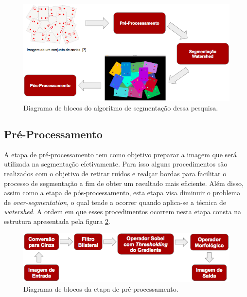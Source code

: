 	\begin{figure}[!htb]
       \begin{center}  
          \includegraphics[width=0.7\columnwidth]{img/diagrama_blocos_algoritmo.jpg}
           \caption{\label{fig:diagrama_blocos_algoritmo}Diagrama de blocos do algoritmo de segmentação dessa pesquisa.}
       \end{center}
   \end{figure} 

\subsection{Pré-Processamento}
A etapa de pré-processamento tem como objetivo preparar a imagem que será utilizada na segmentação efetivamente. Para isso alguns procedimentos são realizados com o objetivo de retirar ruídos e realçar bordas para facilitar o processo de segmentação a fim de obter um resultado mais eficiente. Além disso, assim como a etapa de pós-processamento, esta etapa visa diminuir o problema de \textit{over-segmentation}, o qual tende a ocorrer quando aplica-se a técnica de \textit{watershed}.
A ordem em que esses procedimentos ocorrem nesta etapa consta na estrutura apresentada pela figura \ref{fig:diagrama_blocos_preprocessamento}.

	\begin{figure}[!htb]
       \begin{center}  
          \includegraphics[width=0.8\columnwidth]{img/diagrama_blocos_preprocessamento.jpg}
           \caption{\label{fig:diagrama_blocos_preprocessamento}Diagrama de blocos da etapa de pré-processamento.}
       \end{center}
   \end{figure}

